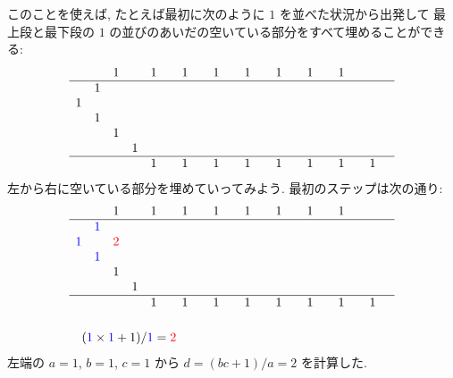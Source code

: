 \documentclass[12pt,twoside,dvipdfm]{jarticle}
\newcommand\red{\color{red}}
\newcommand\blue{\color{blue}}
\renewcommand\r{\red}
\renewcommand\b{\blue}
\theoremstyle{definition} %
\theoremstyle{definition} %
\theoremstyle{definition} %
\numberwithin{theorem}{section}
\numberwithin{equation}{section}
\numberwithin{figure}{section}
\numberwithin{table}{section}
\begin{document}
このことを使えば, たとえば最初に次のように $1$ を並べた状況から出発して
最上段と最下段の $1$ の並びのあいだの空いている部分をすべて埋めることができる:
\begin{equation*}
\begin{array}{cccccccccccccccccccc}
   &   & 1 &   & 1 &   & 1 &   & 1 &   & 1 &   & 1 &   & 1 &   & 1 &   &   &   \\ \hline
   & 1 &   &   &   &   &   &   &   &   &   &   &   &   &   &   &   &   &   &   \\
 1 &   &   &   &   &   &   &   &   &   &   &   &   &   &   &   &   &   &   &   \\
   & 1 &   &   &   &   &   &   &   &   &   &   &   &   &   &   &   &   &   &   \\
   &   & 1 &   &   &   &   &   &   &   &   &   &   &   &   &   &   &   &   &   \\
   &   &   & 1 &   &   &   &   &   &   &   &   &   &   &   &   &   &   &   &   \\ \hline
   &   &   &   & 1 &   & 1 &   & 1 &   & 1 &   & 1 &   & 1 &   & 1 &   & 1 &   \\
\end{array}
\end{equation*}
左から右に空いている部分を埋めていってみよう.
最初のステップは次の通り:
\begin{align*}
&
\begin{array}{cccccccccccccccccccc}
    &   & 1 &   & 1 &   & 1 &   & 1 &   & 1 &   & 1 &   & 1 &   & 1 &   &   &   \\ \hline
    &\b1&   &   &   &   &   &   &   &   &   &   &   &   &   &   &   &   &   &   \\
 \b1&   &\r2&   &   &   &   &   &   &   &   &   &   &   &   &   &   &   &   &   \\
    &\b1&   &   &   &   &   &   &   &   &   &   &   &   &   &   &   &   &   &   \\
    &   & 1 &   &   &   &   &   &   &   &   &   &   &   &   &   &   &   &   &   \\
    &   &   & 1 &   &   &   &   &   &   &   &   &   &   &   &   &   &   &   &   \\ \hline
    &   &   &   & 1 &   & 1 &   & 1 &   & 1 &   & 1 &   & 1 &   & 1 &   & 1 &   \\
\end{array}
\\[\bigskipamount] & \quad
({\b1}\times{\b1}+1)/{\b1}={\r2}
\end{align*} 
左端の $a=1$, $b=1$, $c=1$ から $d=(bc+1)/a=2$ を計算した.
\end{document}
